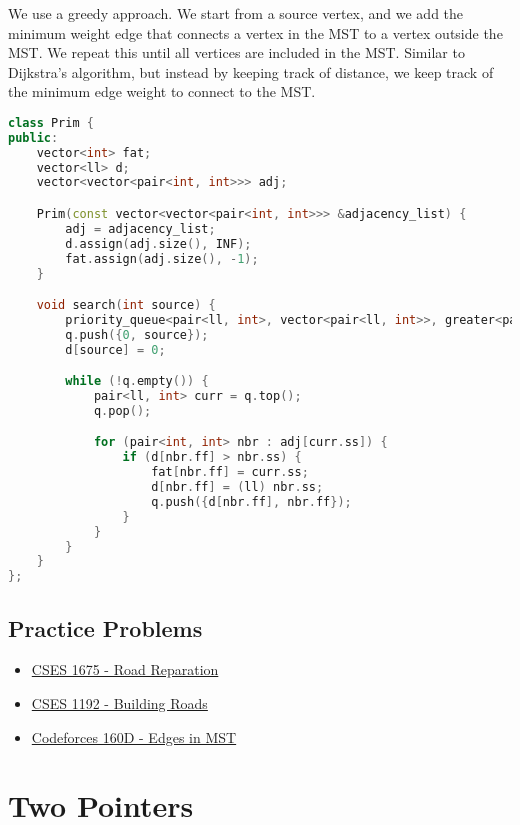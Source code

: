 \documentclass[12pt]{article}
\begin{document}
We use a greedy approach. We start from a source vertex, and we add the minimum weight edge that connects a vertex in the MST to a vertex outside the MST. We repeat this until all vertices are included in the MST. Similar to Dijkstra's algorithm, but instead by keeping track of distance, we keep track of the minimum edge weight to connect to the MST.

\begin{lstlisting}[language=C++]
class Prim {
public:
    vector<int> fat;
    vector<ll> d;
    vector<vector<pair<int, int>>> adj;

    Prim(const vector<vector<pair<int, int>>> &adjacency_list) {
        adj = adjacency_list;
        d.assign(adj.size(), INF);
        fat.assign(adj.size(), -1);
    }

    void search(int source) {
        priority_queue<pair<ll, int>, vector<pair<ll, int>>, greater<pair<ll, int>>> q;
        q.push({0, source});
        d[source] = 0;

        while (!q.empty()) {
            pair<ll, int> curr = q.top();
            q.pop();

            for (pair<int, int> nbr : adj[curr.ss]) {
                if (d[nbr.ff] > nbr.ss) {
                    fat[nbr.ff] = curr.ss;
                    d[nbr.ff] = (ll) nbr.ss;
                    q.push({d[nbr.ff], nbr.ff});
                }
            }
        }
    }
};
\end{lstlisting}
\subsection{Practice Problems}
\begin{itemize}
    \item \href{https://cses.fi/problemset/task/1675}{CSES 1675 - Road Reparation}
    \item \href{https://cses.fi/problemset/task/1192}{CSES 1192 - Building Roads}
    \item \href{https://codeforces.com/problemset/problem/160/D}{Codeforces 160D - Edges in MST}
\end{itemize}


\section{Two Pointers}
\end{document}
